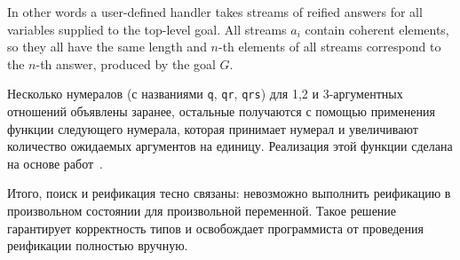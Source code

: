 In other words a user-defined handler takes streams of reified answers for all variables supplied to the top-level
goal. All streams $a_i$ contain coherent elements, so they all have the same length and $n$-th elements of all
streams correspond to the $n$-th answer, produced by the goal $G$.

Несколько нумералов (с названиями \lstinline|q|, \lstinline|qr|, \lstinline|qrs|) для 1,2 и 3-аргументных отношений объявлены заранее,
остальные получаются с помощью применения функции следующего нумерала, которая принимает нумерал и увеличивают количество ожидаемых аргументов на единицу.
Реализация этой функции сделана на основе работ~\cite{Unparsing, DoWeNeed}.


Итого, поиск и реификация тесно связаны: невозможно выполнить реификацию в произвольном состоянии для произвольной переменной.
Такое решение гарантирует корректность типов и освобождает программиста от проведения реификации полностью вручную.

